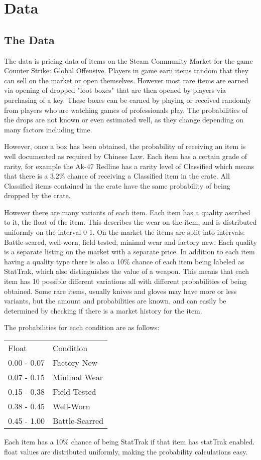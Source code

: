 \documentclass[11pt]{article}
\begin{document}
\section{Data}
\label{sec-3}
\subsection{The Data}
\label{sec-3-1}
The data is pricing data of items on the Steam Community Market for
the game Counter Strike: Global Offensive. Players in game earn items
random that they can sell on the market or open themselves. However
most rare items are earned via opening of dropped "loot boxes" that
are then opened by players via purchasing of a key. These boxes can be
earned by playing or received randomly from players who are watching
games of professionals play. The probabilities of the drops are not
known or even estimated well, as they change depending on many factors
including time. 

However, once a box has been obtained, the probability of receiving an
item is well documented as required by Chinese Law. Each item has a
certain grade of rarity, for example the Ak-47 Redline has a rarity
level of Classified which means that there is a 3.2\% chance of
receiving a Classified item in the crate. All Classified items
contained in the crate have the same probability of being dropped by
the crate.

However there are many variants of each item. Each item has a quality
ascribed to it, the float of the item. This describes the wear on the
item, and is distributed uniformly on the interval 0-1. On the market
the items are split into intervals: Battle-scared, well-worn,
field-tested, minimal wear and factory new. Each quality is a separate
listing on the market with a separate price. In addition to each item
having a quality type there is also a 10\% chance of each item being
labeled as StatTrak, which also distinguishes the value of a
weapon. This means that each item has 10 possible different variations
all with different probabilities of being obtained. Some rare items,
usually knives and gloves may have more or less variants, but the
amount and probabilities are known, and can easily be determined by
checking if there is a market history for the item.

The probabilities for each condition are as follows:
\begin{center}
\begin{tabular}{ll}
Float & Condition\\
0.00 - 0.07 & Factory New\\
0.07 - 0.15 & Minimal Wear\\
0.15 - 0.38 & Field-Tested\\
0.38 - 0.45 & Well-Worn\\
0.45 - 1.00 & Battle-Scarred\\
\end{tabular}
\end{center}
Each item has a 10\% chance of being StatTrak if that item has statTrak
enabled. float values are distributed uniformly, making the
probability calculations easy. 
\end{document}
